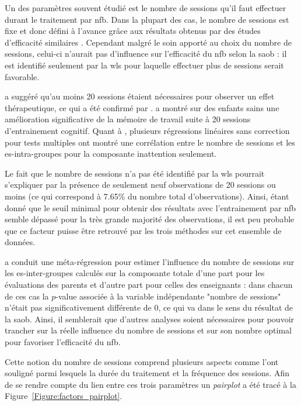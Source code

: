 Un des paramètres souvent étudié est le nombre de sessions qu'il faut effectuer durant le traitement par \gls{nfb}. Dans la plupart des cas, le nombre 
de sessions est fixe et donc défini à l'avance grâce aux résultats obtenus par des études d'efficacité similaires \citep{Enriquez2017}. Cependant malgré le soin apporté
au choix du nombre de sessions, celui-ci n'aurait pas d'influence sur l'efficacité du \gls{nfb} selon la \gls{saob} : il est identifié seulement par la \gls{wls} pour laquelle effectuer 
plus de sessions serait favorable. 

\citet{Vernon2004} a suggéré qu'au moins 20 sessions étaient nécessaires pour observer un effet thérapeutique, 
ce qui a été confirmé par \citet{Arns2014, Arns2009, Wang2014}. 
\citet{Wang2014} a montré sur des enfants sains une amélioration significative de la mémoire de travail suite à 20 sessions d'entrainement cognitif.
Quant à \citet{Arns2009}, plusieurs régressions linéaires sans correction pour tests multiples ont montré une
corrélation entre le nombre de sessions et les \gls{es}-intra-groupes pour la composante inattention seulement. 

Le fait que le nombre de sessions n'a pas été identifié par la \gls{wls}
pourrait s'expliquer par la présence de seulement neuf observations de 20 sessions ou moins (ce qui correspond à 7.65\% du nombre total d'observations). 
Ainsi, étant donné que le seuil minimal pour obtenir des résultats avec l'entrainement par \gls{nfb} semble dépassé pour la très grande majorité des observations, 
il est peu probable que ce facteur puisse être retrouvé par les trois méthodes sur cet ensemble de données. 

\citet{Cortese2016} a conduit une méta-régression pour estimer l'influence du nombre de sessions
sur les \gls{es}-inter-groupes calculés sur la composante totale d'une part pour les évaluations des parents et d'autre part pour celles des enseignants : 
dans chacun de ces cas la $p$-value associée à la variable indépendante "nombre de sessions" n'était pas significativement différente de 0, ce qui va dans le sens 
du résultat de la \gls{saob}. Ainsi, il semblerait que d'autres analyses soient nécessaires pour pouvoir trancher sur la réelle influence du nombre de sessions 
et sur son nombre optimal pour favoriser l'efficacité du \gls{nfb}.

Cette notion du nombre de sessions comprend plusieurs aspects comme l'ont souligné \citet{Strehl2014} parmi lesquels la durée du traitement et la fréquence des 
sessions. Afin de se rendre compte du lien entre ces trois paramètres un \textit{pairplot} a été tracé à la Figure~\ref{Figure:factors_pairplot}.

